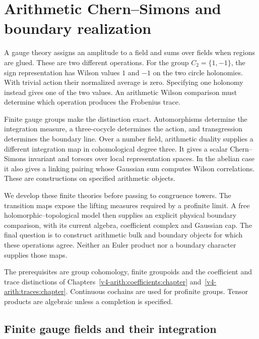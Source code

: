\chapter{Arithmetic Chern--Simons and boundary realization}
\label{v4-arith:cs:chapter}

A gauge theory assigns an amplitude to a field and sums over fields when
regions are glued. These are two different operations. For the group
\(C_2=\{1,-1\}\), the sign representation has Wilson values \(1\) and \(-1\)
on the two circle holonomies. With trivial action their normalized average
is zero. Specifying one holonomy instead gives one of the two values. An
arithmetic Wilson comparison must determine which operation produces the
Frobenius trace.

Finite gauge groups make the distinction exact. Automorphisms determine the
integration measure, a three-cocycle determines the action, and
transgression determines the boundary line. Over a number field, arithmetic
duality supplies a different integration map in cohomological degree three.
It gives a scalar Chern--Simons invariant and torsors over local
representation spaces. In the abelian case it also gives a linking pairing
whose Gaussian sum computes Wilson correlations. These are constructions on
specified arithmetic objects.

We develop these finite theories before passing to congruence towers. The
transition maps expose the lifting measures required by a profinite limit. A
free holomorphic--topological model then supplies an explicit physical
boundary comparison, with its current algebra, coefficient complex and
Gaussian cap. The final question is to construct arithmetic bulk and
boundary objects for which these operations agree. Neither an Euler product
nor a boundary character supplies those maps.

The prerequisites are group cohomology, finite groupoids and the coefficient
and trace distinctions of Chapters~\ref{v4-arith:coefficients:chapter}
and~\ref{v4-arith:traces:chapter}. Continuous cochains are used for
profinite groups. Tensor products are algebraic unless a completion is
specified.

\section{Finite gauge fields and their integration}
\label{v4-arith:cs:finite}

